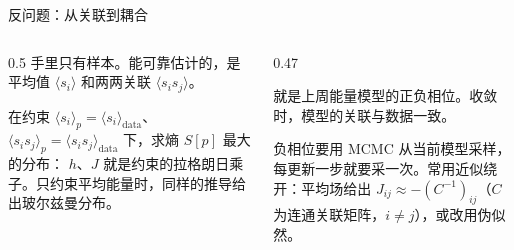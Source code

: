 \documentclass[aspectratio=169,10pt,UTF8,fontset=none]{ctexbeamer}
\begin{document}
\begin{frame}{反问题：从关联到耦合}
  \begin{columns}[T]
    \begin{column}{0.5\textwidth}
      手里只有样本。能可靠估计的，是平均值 $\langle s_i\rangle$ 和两两关联 $\langle s_is_j\rangle$。
      \begin{keystep}[最大熵]
        在约束 $\langle s_i\rangle_p=\langle s_i\rangle_{\mathrm{data}}$、$\langle s_is_j\rangle_p=\langle s_is_j\rangle_{\mathrm{data}}$ 下，求熵 $S[p]$ 最大的分布：
        $h$、$J$ 就是约束的拉格朗日乘子。只约束平均能量时，同样的推导给出玻尔兹曼分布。
      \end{keystep}
    \end{column}
    \begin{column}{0.47\textwidth}
      \begin{keystep}[极大似然]
        就是上周能量模型的正负相位。收敛时，模型的关联与数据一致。
      \end{keystep}
      \begin{caution}[代价]
        负相位要用 MCMC 从当前模型采样，每更新一步就要采一次。常用近似绕开：平均场给出 $J_{ij}\approx-(C^{-1})_{ij}$（$C$ 为连通关联矩阵，$i\neq j$），或改用伪似然。
      \end{caution}
    \end{column}
  \end{columns}
\end{frame}
\end{document}
